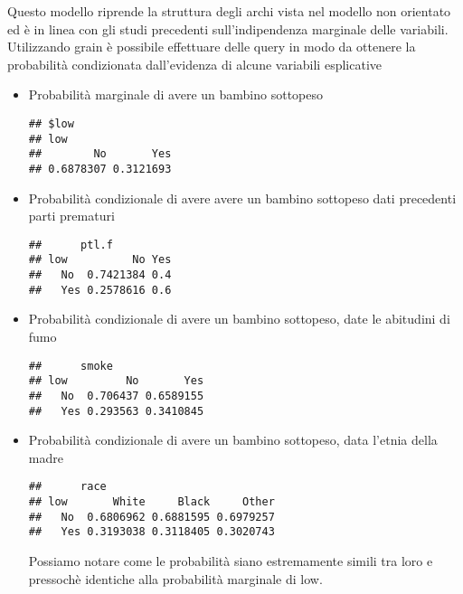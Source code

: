 \documentclass{article}\usepackage[]{graphicx}\usepackage[]{color}
\makeatletter
\newenvironment{kframe}{%
 \def\at@end@of@kframe{}%
 \ifinner\ifhmode%
  \def\at@end@of@kframe{\end{minipage}}%
  \begin{minipage}{\columnwidth}%
 \fi\fi%
 \def\FrameCommand##1{\hskip\@totalleftmargin \hskip-\fboxsep
 \colorbox{shadecolor}{##1}\hskip-\fboxsep
     \hskip-\linewidth \hskip-\@totalleftmargin \hskip\columnwidth}%
 \MakeFramed {\advance\hsize-\width
   \@totalleftmargin\z@ \linewidth\hsize
   \@setminipage}}%
 {\par\unskip\endMakeFramed%
 \at@end@of@kframe}
\newenvironment{knitrout}{}{} %
\makeatother
\begin{document}
Questo modello riprende la struttura degli archi vista nel modello non orientato ed è in linea con gli studi precedenti sull'indipendenza marginale delle variabili.
\\Utilizzando grain è possibile effettuare delle query in modo da ottenere la probabilità condizionata dall'evidenza di alcune variabili esplicative

\begin{itemize}
\item Probabilità marginale di avere un bambino sottopeso
\begin{knitrout}
\color{fgcolor}\begin{kframe}
\begin{verbatim}
## $low
## low
##        No       Yes 
## 0.6878307 0.3121693
\end{verbatim}
\end{kframe}
\end{knitrout}

\item Probabilità condizionale di avere avere un bambino sottopeso dati precedenti parti prematuri
\begin{knitrout}
\color{fgcolor}\begin{kframe}
\begin{verbatim}
##      ptl.f
## low          No Yes
##   No  0.7421384 0.4
##   Yes 0.2578616 0.6
\end{verbatim}
\end{kframe}
\end{knitrout}

\item Probabilità condizionale di avere un bambino sottopeso, date le abitudini di fumo
\begin{knitrout}
\color{fgcolor}\begin{kframe}
\begin{verbatim}
##      smoke
## low         No       Yes
##   No  0.706437 0.6589155
##   Yes 0.293563 0.3410845
\end{verbatim}
\end{kframe}
\end{knitrout}

\item Probabilità condizionale di avere un bambino sottopeso, data l'etnia della madre
\begin{knitrout}
\color{fgcolor}\begin{kframe}
\begin{verbatim}
##      race
## low       White     Black     Other
##   No  0.6806962 0.6881595 0.6979257
##   Yes 0.3193038 0.3118405 0.3020743
\end{verbatim}
\end{kframe}
\end{knitrout}
Possiamo notare come le probabilità siano estremamente simili tra loro e pressochè identiche alla probabilità marginale di low.


\end{itemize}
\end{document}
